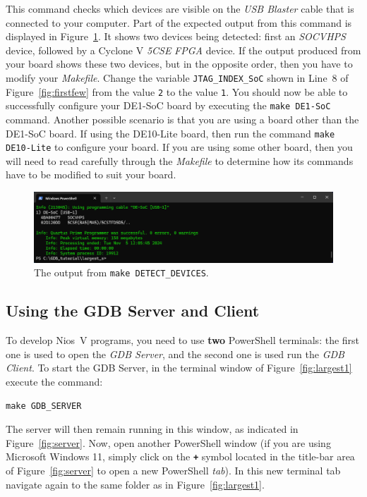 \documentclass[11pt, twoside, pdftex]{article}
\begin{document}
This command checks which devices are visible on the {\it USB Blaster} cable that is connected to
your computer. Part of the expected output from this command is displayed in
Figure~\ref{fig:detect}. It shows 
two devices being detected: first an {\it SOCVHPS} device, followed by a Cyclone V {\it 5CSE} 
{\it FPGA} device.  If the output produced from your board shows these two devices, but in the 
opposite order, then you have to modify your {\it Makefile}.
Change the variable \texttt{JTAG\_INDEX\_SoC} shown in Line~8 of 
Figure~\ref{fig:firstfew} from the value \texttt{2} to the value \texttt{1}. You should now 
be able to successfully configure your DE1-SoC board by executing the \texttt{make DE1-SoC}
command. Another possible scenario is that you are using a board other 
than the DE1-SoC board. If using the DE10-Lite board, then run the 
command \texttt{make DE10-Lite} to configure your board. If you are using some other board, 
then you will need to read carefully through the {\it Makefile} to determine how its
commands have to be modified to suit your board. 

\begin{figure}[h]
    \begin{center}
        \includegraphics[scale=.55]{figures/detect.png}
        \caption{The output from \texttt{make DETECT\_DEVICES}.}
        \label{fig:detect}
    \end{center}
\end{figure}

\subsection{Using the GDB Server and Client}
\label{sec:doit}

To develop Nios~V programs, you need to use {\bf two} PowerShell terminals: the first one
is used to open the {\it GDB Server}, and the second one is used run the {\it GDB Client}. 
To start the GDB Server, in the terminal window of Figure~\ref{fig:largest1} execute the command:

\texttt{make GDB\_SERVER}

The server will then remain running in this window, as indicated in Figure~\ref{fig:server}. 
Now, open another PowerShell window (if you are using Microsoft Windows 11, simply 
click on the {\bf \texttt{+}} symbol located in the title-bar area of 
Figure~\ref{fig:server} to open a new PowerShell {\it tab}). 
In this new terminal tab navigate again to the same folder as in Figure~\ref{fig:largest1}. 
\end{document}
